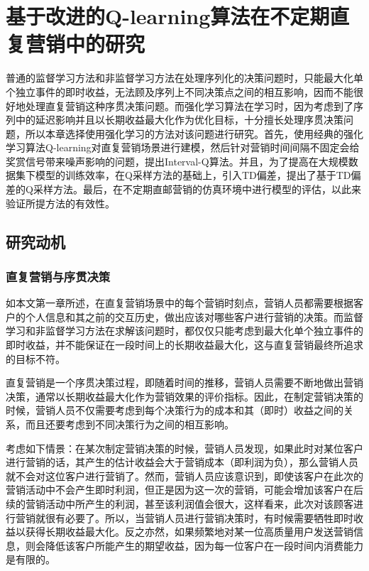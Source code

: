 
\chapter{基于改进的Q-learning算法在不定期直复营销中的研究}
普通的监督学习方法和非监督学习方法在处理序列化的决策问题时，只能最大化单个独立事件的即时收益，无法顾及序列上不同决策点之间的相互影响，因而不能很好地处理直复营销这种序贯决策问题。而强化学习算法在学习时，因为考虑到了序列中的延迟影响并且以长期收益最大化作为优化目标，十分擅长处理序贯决策问题，所以本章选择使用强化学习的方法对该问题进行研究。首先，使用经典的强化学习算法Q-learning对直复营销场景进行建模，然后针对营销时间间隔不固定会给奖赏信号带来噪声影响的问题，提出Interval-Q算法。并且，为了提高在大规模数据集下模型的训练效率，在Q采样方法的基础上，引入TD偏差，提出了基于TD偏差的Q采样方法。最后，在不定期直邮营销的仿真环境中进行模型的评估，以此来验证所提方法的有效性。

\section{研究动机}
\subsection{直复营销与序贯决策}
如本文第一章所述，在直复营销场景中的每个营销时刻点，营销人员都需要根据客户的个人信息和其之前的交互历史，做出应该对哪些客户进行营销的决策。而监督学习和非监督学习方法在求解该问题时，都仅仅只能考虑到最大化单个独立事件的即时收益，并不能保证在一段时间上的长期收益最大化，这与直复营销最终所追求的目标不符。

直复营销是一个序贯决策过程，即随着时间的推移，营销人员需要不断地做出营销决策，通常以长期收益最大化作为营销效果的评价指标。因此，在制定营销决策的时候，营销人员不仅需要考虑到每个决策行为的成本和其（即时）收益之间的关系，而且还要考虑到不同决策行为之间的相互影响。

考虑如下情景：在某次制定营销决策的时候，营销人员发现，如果此时对某位客户进行营销的话，其产生的估计收益会大于营销成本（即利润为负），那么营销人员就不会对这位客户进行营销了。然而，营销人员应该意识到，即使该客户在此次的营销活动中不会产生即时利润，但正是因为这一次的营销，可能会增加该客户在后续的营销活动中所产生的利润，甚至该利润值会很大，这样看来，此次对该顾客进行营销就很有必要了。所以，当营销人员进行营销决策时，有时候需要牺牲即时收益以获得长期收益最大化。反之亦然，如果频繁地对某一位高质量用户发送营销信息，则会降低该客户所能产生的期望收益，因为每一位客户在一段时间内消费能力是有限的。

